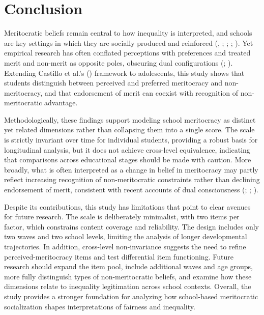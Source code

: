 \documentclass[
  13pt,
]{article}
\begin{document}
\section{Conclusion}\label{conclusion}

Meritocratic beliefs remain central to how inequality is interpreted,
and schools are key settings in which they are socially produced and
reinforced (,
;
;
;
). Yet empirical
research has often conflated perceptions with preferences and treated
merit and non-merit as opposite poles, obscuring dual configurations
(;
). Extending
Castillo et al.'s ()
framework to adolescents, this study shows that students distinguish
between perceived and preferred meritocracy and non-meritocracy, and
that endorsement of merit can coexist with recognition of
non-meritocratic advantage.

Methodologically, these findings support modeling school meritocracy as
distinct yet related dimensions rather than collapsing them into a
single score. The scale is strictly invariant over time for individual
students, providing a robust basis for longitudinal analysis, but it
does not achieve cross-level equivalence, indicating that comparisons
across educational stages should be made with caution. More broadly,
what is often interpreted as a change in belief in meritocracy may
partly reflect increasing recognition of non-meritocratic constraints
rather than declining endorsement of merit, consistent with recent
accounts of dual consciousness (; ;
).

Despite its contributions, this study has limitations that point to
clear avenues for future research. The scale is deliberately minimalist,
with two items per factor, which constrains content coverage and
reliability. The design includes only two waves and two school levels,
limiting the analysis of longer developmental trajectories. In addition,
cross-level non-invariance suggests the need to refine
perceived-meritocracy items and test differential item functioning.
Future research should expand the item pool, include additional waves
and age groups, more fully distinguish types of non-meritocratic
beliefs, and examine how these dimensions relate to inequality
legitimation across school contexts. Overall, the study provides a
stronger foundation for analyzing how school-based meritocratic
socialization shapes interpretations of fairness and inequality.
\end{document}
